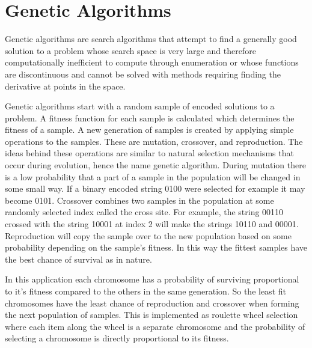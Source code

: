\section{Genetic Algorithms}
Genetic algorithms are search algorithms that attempt to find a generally good solution to a problem whose search space
is very large and therefore computationally inefficient to compute through enumeration or whose functions are discontinuous and cannot
be solved with methods requiring finding the derivative at points in the space. 

Genetic algorithms start with a random sample of encoded solutions to a problem. A fitness function for each sample is calculated which determines the fitness of a sample. A new generation of samples is created by applying simple operations to the samples. These are mutation, crossover, and reproduction. The ideas behind these operations are similar to natural selection mechanisms that occur during evolution, hence the name genetic algorithm. During mutation there is a low probability that a part of a sample in the population will be changed in some small way. If a binary encoded string 0100 were selected for example it may become 0101. Crossover combines two samples in the population at some randomly selected index called the cross site. For example, the string 00110 crossed with the string 10001 at index 2 will make the strings 10110 and 00001. Reproduction will copy the sample over to the new population based on some probability depending on the sample's fitness. In this way the fittest samples have the best chance of survival as in nature.

 In this application each chromosome has a probability of surviving proportional to it's fitness compared to the others in the same generation. So the least fit chromosomes have the least chance of reproduction and crossover when forming the next population of samples. This is implemented as roulette wheel selection where each item along the wheel is a separate chromosome and the probability of selecting a chromosome is directly proportional to its fitness.    


